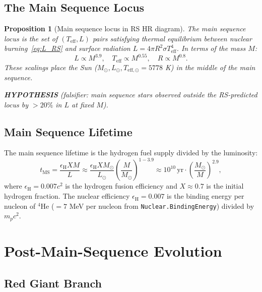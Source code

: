 \documentclass[12pt,a4paper]{article}
\newtheorem{proposition}[theorem]{Proposition}
\theoremstyle{definition}
\theoremstyle{remark}
\begin{document}
\subsection{The Main Sequence Locus}

\begin{proposition}[Main sequence locus in RS HR diagram]\label{prop:MS}
The main sequence locus is the set of $(T_\mathrm{eff}, L)$ pairs
satisfying thermal equilibrium between nuclear burning~\eqref{eq:L_RS}
and surface radiation $L = 4\pi R^2 \sigma T_\mathrm{eff}^4$.  In
terms of the mass $M$:
\begin{equation}
  L \propto M^{3.9}, \quad
  T_\mathrm{eff} \propto M^{0.55}, \quad
  R \propto M^{0.8}.
  \label{eq:MS_scaling}
\end{equation}
These scalings place the Sun ($M_\odot, L_\odot, T_{\mathrm{eff},\odot}
= 5778$ K) in the middle of the main sequence.

\textbf{HYPOTHESIS} (falsifier: main sequence stars observed outside
the RS-predicted locus by $> 20\%$ in $L$ at fixed $M$).
\end{proposition}

\subsection{Main Sequence Lifetime}

The main sequence lifetime is the hydrogen fuel supply divided by the
luminosity:
\begin{equation}
  t_\mathrm{MS} = \frac{\epsilon_\mathrm{H} X M}{L}
  \approx \frac{\epsilon_\mathrm{H} X M_\odot}{L_\odot}
  \left(\frac{M}{M_\odot}\right)^{1-3.9}
  \approx 10^{10}\,\mathrm{yr} \cdot \left(\frac{M_\odot}{M}\right)^{2.9},
  \label{eq:tMS}
\end{equation}
where $\epsilon_\mathrm{H} = 0.007 c^2$ is the hydrogen fusion efficiency
and $X \approx 0.7$ is the initial hydrogen fraction.  The nuclear
efficiency $\epsilon_\mathrm{H} = 0.007$ is the binding energy per
nucleon of $^4$He ($= 7$ MeV per nucleon from \texttt{Nuclear.BindingEnergy})
divided by $m_p c^2$.

\section{Post-Main-Sequence Evolution}
\label{sec:postMS}

\subsection{Red Giant Branch}
\end{document}
